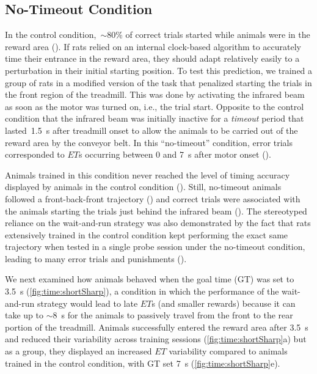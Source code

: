 \subsection{No-Timeout Condition}
\label{ch:time:nto}

In the control condition,~$\sim$80\% of correct trials started while animals were in the reward area ().
If rats relied on an internal clock-based algorithm to accurately time their entrance in the reward area, they should adapt relatively easily to a perturbation in their initial starting position.
To test this prediction, we trained a group of rats in a modified version of the task that penalized starting the trials in the front region of the treadmill.
This was done by activating the infrared beam as soon as the motor was turned on, i.e., the trial start.
Opposite to the control condition that the infrared beam was initially inactive for a \emph{timeout} period that lasted~1.5~s after treadmill onset to allow the animals to be carried out of the reward area by the conveyor belt.
In this ``no-timeout'' condition, error trials corresponded to $ET$s occurring between 0 and 7~s after motor onset ().

Animals trained in this condition never reached the level of timing accuracy displayed by animals in the control condition ().
Still, no-timeout animals followed a front-back-front trajectory () and correct trials were associated with the animals starting the trials just behind the infrared beam ().
The stereotyped reliance on the wait-and-run strategy was also demonstrated by the fact that rats extensively trained in the control condition kept performing the exact same trajectory when tested in a single probe session under the no-timeout condition, leading to many error trials and punishments ().
\par

We next examined how animals behaved when the goal time (GT) was set to 3.5~s (\autoref{fig:time:shortSharp}), a condition in which the performance of the wait-and-run strategy would lead to late $ET$s (and smaller rewards) because it can take up to $\sim$8~s for the animals to passively travel from the front to the rear portion of the treadmill.
Animals successfully entered the reward area after 3.5~s and reduced their variability across training sessions (\autoref{fig:time:shortSharp}a) but as a group, they displayed an increased $ET$ variability compared to animals trained in the control condition, with GT set 7~s (\autoref{fig:time:shortSharp}e).
